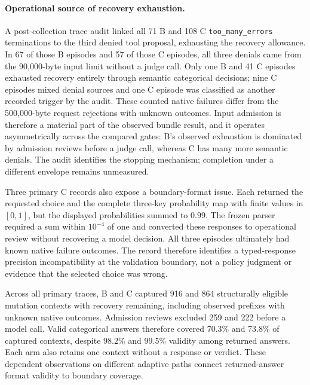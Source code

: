 \paragraph{Operational source of recovery exhaustion.}
A post-collection trace audit linked all 71 B and 108 C
\texttt{too\_many\_errors} terminations to the third denied tool proposal,
exhausting the recovery allowance. In 67 of those B episodes and 57 of those
C episodes, all three denials came from the 90,000-byte input limit without
a judge call. Only one B and 41 C episodes exhausted recovery entirely through
semantic categorical decisions; nine C episodes mixed denial sources and one
C episode was classified as another recorded trigger by the audit.
These counted native failures differ from the 500,000-byte request rejections
with unknown outcomes. Input admission is therefore a material part of the
observed bundle result, and it operates asymmetrically across the compared
gates: B's observed exhaustion is dominated by admission reviews before a
judge call, whereas C has many more semantic denials. The audit identifies
the stopping mechanism;
completion under a different envelope remains unmeasured.

Three primary C records also expose a boundary-format issue. Each returned the
requested choice and the complete three-key probability map with finite values
in $[0,1]$, but the displayed probabilities summed to $0.99$. The frozen
parser required a sum within $10^{-4}$ of one and converted these responses to
operational review without recovering a model decision. All three episodes
ultimately had known native failure outcomes.
The record therefore identifies a typed-response precision incompatibility at
the validation boundary, not a policy judgment or evidence that the selected
choice was wrong.

Across all primary traces, B and C captured 916 and 864 structurally eligible
mutation contexts with recovery remaining, including observed prefixes with
unknown native outcomes.
Admission reviews excluded 259 and 222 before a model call. Valid categorical
answers therefore covered 70.3\% and 73.8\% of captured contexts, despite
98.2\% and 99.5\% validity among returned answers. Each arm also retains one
context without a response or verdict. These dependent observations on
different adaptive paths connect returned-answer format validity to boundary coverage.

